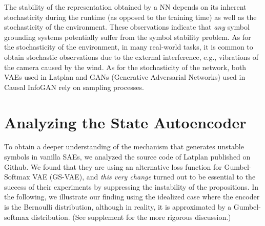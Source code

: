 
The stability of the representation obtained by a NN depends
on
its inherent stochasticity during the runtime (as opposed to the training time) as well as
the stochasticity of the environment.
% 
These observations indicate that \emph{any} symbol grounding systems potentially suffer from 
the symbol stability problem.
% 
As for the stochasticity of the environment,
in many real-world tasks, it is common to obtain stochastic observations
due to the external interference, e.g., vibrations of the camera caused by the wind.
% 
As for the stochasticity of the network,
both
VAEs \cite{kingma2013auto,jang2016categorical,higgins2016beta} used in Latplan
and
GANs (Generative Adversarial Networks) \cite{goodfellow2014generative} used in Causal InfoGAN \cite{kurutach2018learning}
rely on sampling processes.

\section{Analyzing the State Autoencoder}
\label{analysis}

To obtain a deeper understanding of the mechanism that generates
unstable symbols in vanilla SAEs, we
analyzed the source code of Latplan published on Github.
% 
We found that they are using an alternative loss function for Gumbel-Softmax VAE (GS-VAE),
and \emph{this very change} turned out to be essential to the success of their experiments
by suppressing the instability of the propositions.
In the following, we illustrate our finding using the idealized case where the encoder is the Bernoulli distribution,
although in reality, it is approximated by a Gumbel-softmax distribution.
(See supplement  for the more rigorous discussion.)


